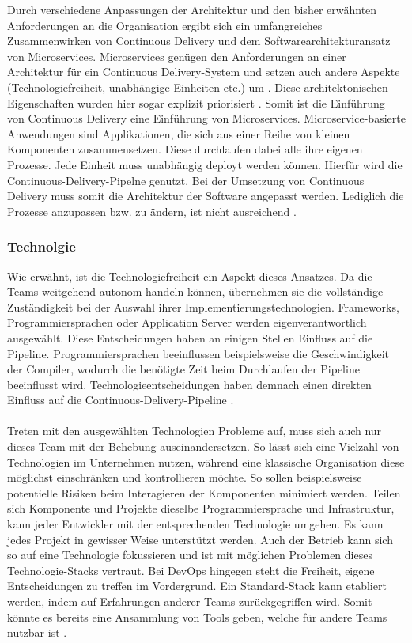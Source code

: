 Durch verschiedene Anpassungen der Architektur und den bisher erwähnten Anforderungen an die Organisation ergibt sich ein umfangreiches Zusammenwirken von Continuous Delivery und dem Softwarearchitekturansatz von Microservices. Microservices genügen den Anforderungen an einer Architektur für ein Continuous Delivery-System und setzen auch andere Aspekte (Technologiefreiheit, unabhängige Einheiten etc.) um \cite{Wolff.2016}. Diese architektonischen Eigenschaften wurden hier sogar explizit priorisiert \cite{continuousdelivery.2017}. Somit ist die Einführung von Continuous Delivery eine Einführung von Microservices. Microservice-basierte Anwendungen sind Applikationen, die sich aus einer Reihe von kleinen Komponenten zusammensetzen. Diese durchlaufen dabei alle ihre eigenen Prozesse. Jede Einheit muss unabhängig deployt werden können. Hierfür wird die Continuous-Delivery-Pipelne genutzt. Bei der Umsetzung von Continuous Delivery muss somit die Architektur der Software angepasst werden. Lediglich die Prozesse anzupassen bzw. zu ändern, ist nicht ausreichend \cite{Wolff.2016}.

\subsubsection{Technolgie}
Wie erwähnt, ist die Technologiefreiheit ein Aspekt dieses Ansatzes. Da die Teams weitgehend autonom handeln können, übernehmen sie die vollständige Zuständigkeit bei der Auswahl ihrer Implementierungstechnologien. Frameworks, Programmiersprachen oder Application Server werden eigenverantwortlich ausgewählt. Diese Entscheidungen haben an einigen Stellen Einfluss auf die Pipeline. Programmiersprachen beeinflussen beispielsweise die Geschwindigkeit der Compiler, wodurch die benötigte Zeit beim Durchlaufen der Pipeline beeinflusst wird. Technologieentscheidungen haben demnach einen direkten Einfluss auf die Continuous-Delivery-Pipeline \cite{Wolff.2016}.\\ \\
Treten mit den ausgewählten Technologien Probleme auf, muss sich auch nur dieses Team mit der Behebung auseinandersetzen. So lässt sich eine Vielzahl von Technologien im Unternehmen nutzen, während eine klassische Organisation diese möglichst einschränken und kontrollieren möchte. So sollen beispielsweise potentielle Risiken beim Interagieren der Komponenten minimiert werden. Teilen sich Komponente und Projekte dieselbe Programmiersprache und Infrastruktur, kann jeder Entwickler mit der entsprechenden Technologie umgehen. Es kann jedes Projekt in gewisser Weise unterstützt werden. Auch der Betrieb kann sich so auf eine Technologie fokussieren und ist mit möglichen Problemen dieses Technologie-Stacks vertraut. Bei DevOps hingegen steht die Freiheit, eigene Entscheidungen zu treffen im Vordergrund. Ein Standard-Stack kann etabliert werden, indem auf Erfahrungen anderer Teams zurückgegriffen wird. Somit könnte es bereits eine Ansammlung von Tools geben, welche für andere Teams nutzbar ist \cite{Wolff.2016}. 

